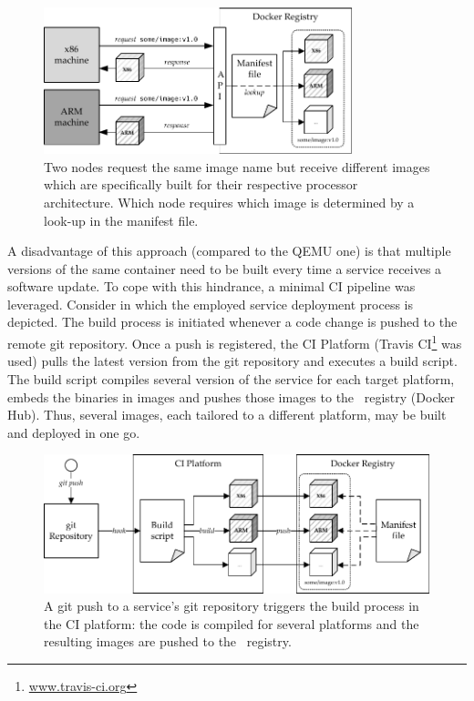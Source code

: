 \begin{figure}[htpb]
  \centering
  \includegraphics[width=0.8\textwidth]{figures/manifest-pull}
  \caption[Pulling \docker\ images via manifest file]{Two nodes request the same image name but receive different images which are specifically built for their respective processor architecture. Which node requires which image is determined by a look-up in the manifest file.}\label{fig:manifest-pull}
\end{figure}

A disadvantage of this approach (compared to the QEMU one) is that multiple versions of the same container need to be built every time a service receives a software update. To cope with this hindrance, a minimal CI pipeline was leveraged. Consider  in which the employed service deployment process is depicted. The build process is initiated whenever a code change is pushed to the remote git repository. Once a push is registered, the CI Platform (Travis CI\footnote{\url{www.travis-ci.org}} was used) pulls the latest version from the git repository and executes a build script. The build script compiles several version of the service for each target platform, embeds the binaries in images and pushes those images to the \docker\ registry (Docker Hub). Thus, several images, each tailored to a different platform, may be built and deployed in one go.

\begin{figure}[htpb]
  \centering
  \includegraphics[width=\textwidth]{figures/manifest-push}
  \caption[Pushing \docker\ images via CI]{A git push to a service's git repository triggers the build process in the CI platform: the code is compiled for several platforms and the resulting images are pushed to the \docker\ registry.}\label{fig:manifest-push}
\end{figure}

